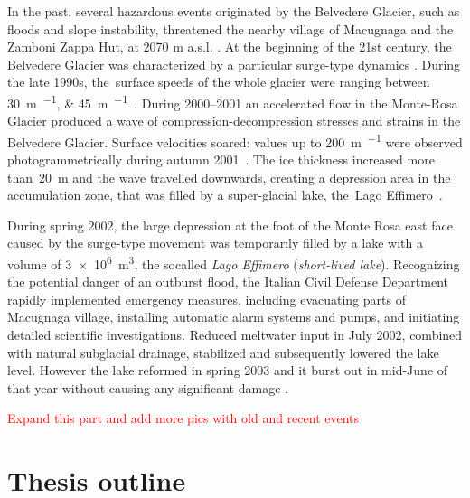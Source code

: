 In the past, several hazardous events originated by the Belvedere Glacier, such as floods
and slope instability, threatened the nearby village of Macugnaga and the Zamboni Zappa
Hut, at 2070 m a.s.l. \citep{Kaab2004}.
At the beginning of the 21st century, the Belvedere Glacier was characterized by a
particular surge-type dynamics  \citep{Haeberli2002}.
During the late 1990s, the~surface speeds of the whole glacier were ranging between
\SIlist{30;45}{\meter\per\year}~\citep{Roethlisberger1985, Kaab2005}.
During 2000--2001 an accelerated flow in the Monte-Rosa Glacier produced a wave of
compression-decompression stresses and strains in the Belvedere Glacier.
Surface velocities soared: values up to \SI{200}{\meter\per\year} were observed
photogrammetrically during autumn 2001~\citep{Kaab2004}.
The ice thickness increased more than~\SI{20}{\meter} and the wave travelled downwards,
creating a depression area in the accumulation zone, that was filled by a super-glacial
lake, the~Lago Effimero~\citep{Haeberli2002, Mortara2009}.


During spring 2002, the large depression at the foot of the Monte Rosa east face caused by the 
surge-type movement was temporarily filled by a lake with a volume of \SI{3e6}{\cubic\meter}, 
the socalled \textit{Lago Effimero} (\textit{short-lived lake}).
Recognizing the potential danger of an outburst flood, the Italian Civil Defense Department rapidly 
implemented emergency measures, including evacuating parts of Macugnaga village, installing automatic 
alarm systems and pumps, and initiating detailed scientific investigations. 
Reduced meltwater input in July 2002, combined with natural subglacial drainage, stabilized and subsequently 
lowered the lake level.
However the lake reformed in spring 2003 and it burst out in mid-June of that year without causing 
any significant damage \citep{Kaab2004}.

\textcolor{red}{Expand this part and add more pics with old and recent events}


\section{Thesis outline}

\makechapterbibliography{}